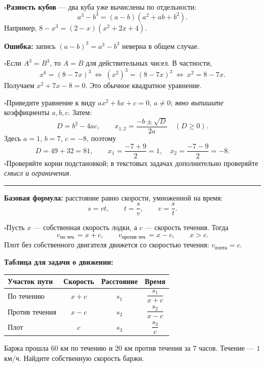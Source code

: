 \documentclass[a4paper,12pt]{article}
\newcommand{\checkitem}{\ensuremath{\square}\enspace}
\newcommand{\keyidea}[1]{\textcolor{darkaccent}{\bfseries #1}}
\newcommand{\sectionline}{\vspace{0.3em}\noindent\textcolor{accent}{\rule{\linewidth}{0.5pt}}\vspace{0.2em}}
\renewcommand{\section}[1]{\Needspace{5\baselineskip}\par\vspace{0.65em}\noindent{\Large\color{darkaccent}\bfseries #1}\par\vspace{0.15em}\sectionline}
\newcommand{\subhead}[1]{\par\vspace{0.4em}{\large\bfseries #1}\par\vspace{0.06em}}
\begin{document}
\checkitem \keyidea{Разность кубов} — два куба уже вычислены по отдельности:
\[
a^3-b^3=(a-b)(a^2+ab+b^2).
\]
Например, \(8-x^3=(2-x)(x^2+2x+4)\).

\keyidea{Ошибка:} запись \((a-b)^3=a^3-b^3\) неверна в общем случае.

\subhead{Как убрать куб из обеих частей уравнения}
\checkitem Если \(A^3=B^3\), то \(A=B\) для действительных чисел. В частности,
\[
 x^6=(8-7x)^3
 \ \Longleftrightarrow\ (x^2)^3=(8-7x)^3
 \ \Longleftrightarrow\ x^2=8-7x.
\]
Получаем \(x^2+7x-8=0\). Это обычное квадратное уравнение.

\subhead{Порядок решения квадратного уравнения}
\checkitem Приведите уравнение к виду \(ax^2+bx+c=0\), \(a\ne0\); \emph{явно выпишите} коэффициенты \(a,b,c\). Затем:
\[
D=b^2-4ac,\qquad x_{1,2}=\frac{-b\pm\sqrt{D}}{2a}\quad(D\ge0).
\]
Здесь \(a=1\), \(b=7\), \(c=-8\), поэтому
\[
D=49+32=81,\qquad
x_1=\frac{-7+9}{2}=1,\quad x_2=\frac{-7-9}{2}=-8.
\]
\checkitem Проверяйте корни подстановкой; в текстовых задачах дополнительно проверяйте \emph{смысл и ограничения}.

\section{2. Движение по реке}
\keyidea{Базовая формула:} расстояние равно скорости, умноженной на время:
\[
s=vt,\qquad t=\frac{s}{v},\qquad v=\frac{s}{t}.
\]

\checkitem Пусть \(x\) — собственная скорость лодки, а \(c\) — скорость течения. Тогда
\[
v_{\text{по теч.}}=x+c,\qquad v_{\text{против теч.}}=x-c,
\qquad x>c.
\]
Плот без собственного двигателя движется со скоростью течения: \(v_{\text{плота}}=c\).

\smallskip
\noindent\textbf{Таблица для задачи о движении:}\par
\smallskip
\renewcommand{\arraystretch}{1.35}
\begin{tabularx}{\linewidth}{@{}Xccc@{}}
\toprule
Участок пути & Скорость & Расстояние & Время \\
\midrule
По течению & \(x+c\) & \(s_1\) & \(\dfrac{s_1}{x+c}\)\\
Против течения & \(x-c\) & \(s_2\) & \(\dfrac{s_2}{x-c}\)\\
Плот & \(c\) & \(s_3\) & \(\dfrac{s_3}{c}\)\\
\bottomrule
\end{tabularx}
\renewcommand{\arraystretch}{1}

\subhead{Пример 1. Два участка пути}
Баржа прошла \(60\) км по течению и \(20\) км против течения за \(7\) часов. Течение — \(1\) км/ч. Найдите собственную скорость баржи.
\end{document}
